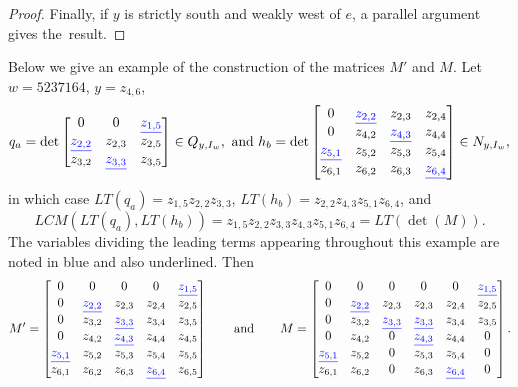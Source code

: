 \documentclass[ALCO,Unicode,published]{cedram}
\begin{document}
\begin{proof}
Finally, if $y$ is strictly south and weakly west of $e$, a parallel argument gives the~result.
\end{proof}

\begin{example}\label{ex:formM}
Below we give an example of the construction of the matrices $M'$ and $M$.  Let $w = 5237164$, $y = z_{4,6}$, \[
q_a = \det \begin{bmatrix} 0& 0 & {\color{blue}\underline{z_{1,5}}}\\
{\color{blue}\underline{z_{2,2}}} & z_{2,3} & z_{2,5}\\
z_{3,2}& {\color{blue}\underline{z_{3,3}}} & z_{3,5}
 \end{bmatrix} \in Q_{y, I_w}, \mbox{ and } h_b = \det \begin{bmatrix} 
 0 & {\color{blue}\underline{z_{2,2}}} & z_{2,3} & z_{2,4} \\
0 & z_{4,2} & {\color{blue}\underline{z_{4,3}}} & z_{4,4} \\
{ \color{blue} \underline{z_{5,1}}} & z_{5,2} & z_{5,3} & z_{5,4} \\
  z_{6,1} & z_{6,2} & z_{6,3} & {\color{blue}\underline{z_{6,4}}} \\
 \end{bmatrix} \in N_{y,I_w},
 \] in which case $LT(q_a) = z_{1,5}z_{2,2}z_{3,3}$, $LT(h_b) = z_{2,2}z_{4,3}z_{5,1}z_{6,4}$, and \[ 
 LCM(LT(q_a),LT(h_b)) = z_{1,5}z_{2,2}z_{3,3}z_{4,3}z_{5,1}z_{6,4} = LT(\det(M)).
 \]  The variables dividing the leading terms appearing throughout this example are noted in blue and also underlined.  Then \[
 M' = \begin{bmatrix} 
 0 & 0 & 0 & 0 & {\color{blue}\underline{z_{1,5}}}\\
 0 & {\color{blue}\underline{z_{2,2}}} & z_{2,3} & z_{2,4} & z_{2,5}\\
  0 & z_{3,2} & {\color{blue}\underline{z_{3,3}}} & z_{3,4} & z_{3,5}\\
0 & z_{4,2} & {\color{blue}\underline{z_{4,3}}} & z_{4,4} & z_{4,5}\\
  {\color{blue}\underline{z_{5,1}}} & z_{5,2} & z_{5,3} & z_{5,4} & z_{5,5} \\
  z_{6,1} & z_{6,2} & z_{6,3} &  {\color{blue}\underline{z_{6,4}}} & z_{6,5} 
 \end{bmatrix} \mbox{  \hspace{0.5cm}   and  \hspace{0.5cm}   } M  = \begin{bmatrix} 
 0 & 0 & 0 & 0 & 0 & {\color{blue}\underline{z_{1,5}}}\\
 0 & {\color{blue}\underline{z_{2,2}}} & z_{2,3} & z_{2,3} & z_{2,4} & z_{2,5}\\
  0 & z_{3,2} & {\color{blue}\underline{z_{3,3}}} & {\color{blue}\underline{z_{3,3}}} & z_{3,4} & z_{3,5}\\
0 & z_{4,2} & 0 & {\color{blue}\underline{z_{4,3}}}  & z_{4,4} & 0\\
  {\color{blue}\underline{z_{5,1}}} & z_{5,2} & 0 & z_{5,3} & z_{5,4} &0 \\
  z_{6,1} & z_{6,2} & 0  & z_{6,3}& {\color{blue}\underline{z_{6,4}}}  & 0
 \end{bmatrix}.
 \] 


\end{example}
\end{document}
